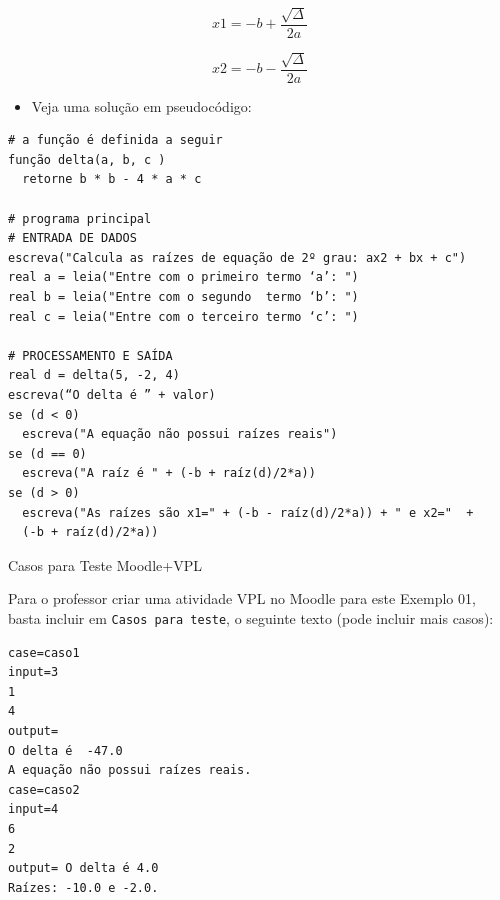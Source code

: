 \documentclass[12pt,a4paper]{article}
\providecommand{\tightlist}{%
      \setlength{\itemsep}{0pt}\setlength{\parskip}{0pt}}
\begin{document}
\[x1 = -b+\frac{\sqrt{\Delta}}{2a}\]

\[x2 = -b-\frac{\sqrt{\Delta}}{2a}\]

\begin{itemize}
\tightlist
\item
  Veja uma solução em pseudocódigo:
\end{itemize}

    \begin{verbatim}
# a função é definida a seguir
função delta(a, b, c )
  retorne b * b - 4 * a * c
 
# programa principal  
# ENTRADA DE DADOS
escreva("Calcula as raízes de equação de 2º grau: ax2 + bx + c")
real a = leia("Entre com o primeiro termo ‘a’: ")
real b = leia("Entre com o segundo  termo ‘b’: ") 
real c = leia("Entre com o terceiro termo ‘c’: ") 
 
# PROCESSAMENTO E SAÍDA
real d = delta(5, -2, 4)
escreva(“O delta é ” + valor)
se (d < 0)  
  escreva("A equação não possui raízes reais")
se (d == 0) 
  escreva("A raíz é " + (-b + raíz(d)/2*a))
se (d > 0)  
  escreva("As raízes são x1=" + (-b - raíz(d)/2*a)) + " e x2="  + 
  (-b + raíz(d)/2*a))
\end{verbatim}

    Casos para Teste Moodle+VPL

Para o professor criar uma atividade VPL no Moodle para este Exemplo 01,
basta incluir em \texttt{Casos\ para\ teste}, o seguinte texto (pode
incluir mais casos):

\begin{verbatim}
case=caso1
input=3
1
4
output= 
O delta é  -47.0
A equação não possui raízes reais.
case=caso2
input=4
6
2
output= O delta é 4.0
Raízes: -10.0 e -2.0.
\end{verbatim}
\end{document}
